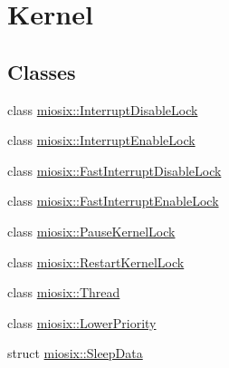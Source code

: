 \hypertarget{group___kernel}{\section{Kernel}
\label{group___kernel}
}
\subsection*{Classes}
\begin{DoxyCompactItemize}
\item 
class \hyperlink{classmiosix_1_1_interrupt_disable_lock}{miosix\-::\-Interrupt\-Disable\-Lock}
\item 
class \hyperlink{classmiosix_1_1_interrupt_enable_lock}{miosix\-::\-Interrupt\-Enable\-Lock}
\item 
class \hyperlink{classmiosix_1_1_fast_interrupt_disable_lock}{miosix\-::\-Fast\-Interrupt\-Disable\-Lock}
\item 
class \hyperlink{classmiosix_1_1_fast_interrupt_enable_lock}{miosix\-::\-Fast\-Interrupt\-Enable\-Lock}
\item 
class \hyperlink{classmiosix_1_1_pause_kernel_lock}{miosix\-::\-Pause\-Kernel\-Lock}
\item 
class \hyperlink{classmiosix_1_1_restart_kernel_lock}{miosix\-::\-Restart\-Kernel\-Lock}
\item 
class \hyperlink{classmiosix_1_1_thread}{miosix\-::\-Thread}
\item 
class \hyperlink{classmiosix_1_1_lower_priority}{miosix\-::\-Lower\-Priority}
\item 
struct \hyperlink{structmiosix_1_1_sleep_data}{miosix\-::\-Sleep\-Data}
\end{DoxyCompactItemize}
